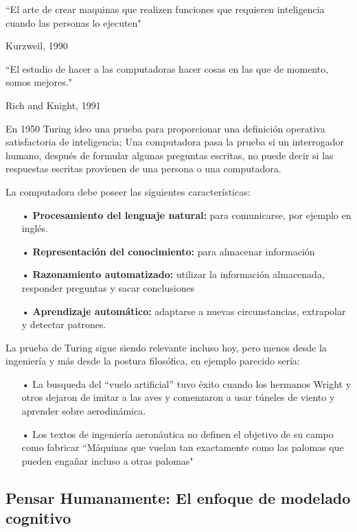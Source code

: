 \documentclass[12pt,a4paper]{book}
\begin{document}
\begin{blockquote}
``El arte de crear maquinas que realizen funciones que requieren inteligencia cuando las personas lo ejecuten"

\noindent\hfill
Kurzweil, 1990
\end{blockquote}
\bigskip

\begin{blockquote}
``El estudio de hacer a las computadoras hacer cosas en las que de momento, somos mejores."

\noindent\hfill
Rich and Knight, 1991
\end{blockquote}
\bigskip

En 1950 Turing ideo una prueba para proporcionar una definición operativa satisfactoria de inteligencia; Una computadora pasa la prueba si un interrogador humano, después de formular algunas preguntas escritas, no puede decir si las respuestas escritas provienen de una persona o una computadora.
\bigskip

La computadora debe poseer las siguientes características:
\begin{enumerate}
\item[•] \textbf{Procesamiento del lenguaje natural:} para comunicarse, por ejemplo en inglés.
\item[•] \textbf{Representación del conocimiento:} para almacenar información
\item[•] \textbf{Razonamiento automatizado:} utilizar la información almacenada, responder preguntas y sacar conclusiones
\item[•] \textbf{Aprendizaje automático:} adaptarse a nuevas circunstancias, extrapolar y detectar patrones.
\end{enumerate}
La prueba de Turing sigue siendo relevante incluso hoy, pero menos desde la ingeniería y más desde la postura filosófica, en ejemplo parecido sería:
\begin{enumerate}
\item[•] La busqueda del ``vuelo artificial'' tuvo éxito cuando los hermanos Wright y otros dejaron de imitar a las aves y comenzaron a usar túneles de viento y aprender sobre aerodinámica.
\item[•] Los textos de ingeniería aeronáutica no definen el objetivo de su campo como fabricar ``Máquinas que vuelan tan exactamente como las palomas que pueden engañar incluso a otras palomas"
\end{enumerate}
\subsection{Pensar Humanamente: El enfoque de modelado  cognitivo}
\end{document}
